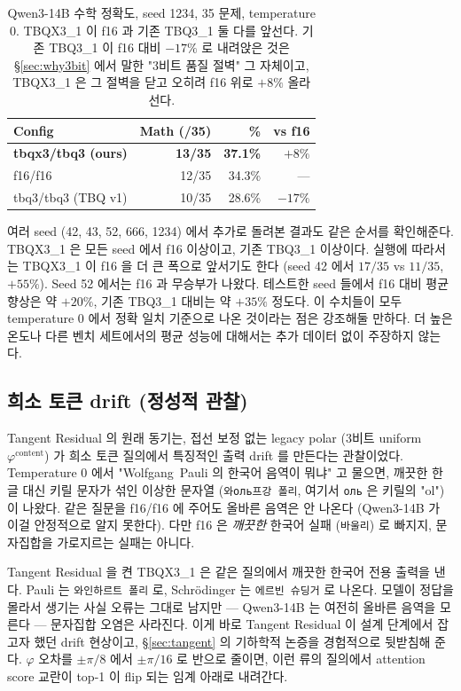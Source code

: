 \documentclass[10pt,twocolumn]{article}
\begin{document}
\begin{table}[t]
\centering
\small
\begin{tabular}{@{}lrrr@{}}
\toprule
\textbf{Config} & \textbf{Math (/35)} & \textbf{\%} & \textbf{vs f16} \\
\midrule
\textbf{tbqx3/tbq3 (ours)} & \textbf{13/35} & \textbf{37.1\%} & \textbf{$+8\%$} \\
f16/f16                    & 12/35 & 34.3\% & --- \\
tbq3/tbq3 (TBQ v1)         & 10/35 & 28.6\% & $-17\%$ \\
\bottomrule
\end{tabular}
\caption{Qwen3-14B 수학 정확도, seed 1234, 35 문제, temperature $0$. TBQX3\_1 이 f16 과 기존 TBQ3\_1 둘 다를 앞선다. 기존 TBQ3\_1 이 f16 대비 $-17\%$ 로 내려앉은 것은 \S\ref{sec:why3bit} 에서 말한 "3비트 품질 절벽" 그 자체이고, TBQX3\_1 은 그 절벽을 닫고 오히려 f16 위로 $+8\%$ 올라선다.}
\label{tab:math}
\end{table}

여러 seed (42, 43, 52, 666, 1234) 에서 추가로 돌려본 결과도 같은 순서를 확인해준다. TBQX3\_1 은 모든 seed 에서 f16 이상이고, 기존 TBQ3\_1 이상이다. 실행에 따라서는 TBQX3\_1 이 f16 을 더 큰 폭으로 앞서기도 한다 (seed 42 에서 $17/35$ vs $11/35$, $+55\%$). Seed 52 에서는 f16 과 무승부가 나왔다. 테스트한 seed 들에서 f16 대비 평균 향상은 약 $+20\%$, 기존 TBQ3\_1 대비는 약 $+35\%$ 정도다. 이 수치들이 모두 temperature $0$ 에서 정확 일치 기준으로 나온 것이라는 점은 강조해둘 만하다. 더 높은 온도나 다른 벤치 세트에서의 평균 성능에 대해서는 추가 데이터 없이 주장하지 않는다.

\subsection{희소 토큰 drift (정성적 관찰)}

Tangent Residual 의 원래 동기는, 접선 보정 없는 legacy polar (3비트 uniform $\varphi^{\text{content}}$) 가 희소 토큰 질의에서 특징적인 출력 drift 를 만든다는 관찰이었다. Temperature $0$ 에서 "Wolfgang~Pauli 의 한국어 음역이 뭐냐" 고 물으면, 깨끗한 한글 대신 키릴 문자가 섞인 이상한 문자열 (\texttt{와оль프강 폴리}, 여기서 \texttt{оль} 은 키릴의 "ol") 이 나왔다. 같은 질문을 f16/f16 에 주어도 올바른 음역은 안 나온다 (Qwen3-14B 가 이걸 안정적으로 알지 못한다). 다만 f16 은 \emph{깨끗한} 한국어 실패 (\texttt{바울리}) 로 빠지지, 문자집합을 가로지르는 실패는 아니다.

Tangent Residual 을 켠 TBQX3\_1 은 같은 질의에서 깨끗한 한국어 전용 출력을 낸다. Pauli 는 \texttt{와인하르트 폴리} 로, Schrödinger 는 \texttt{에르빈 슈딩거} 로 나온다. 모델이 정답을 몰라서 생기는 사실 오류는 그대로 남지만 --- Qwen3-14B 는 여전히 올바른 음역을 모른다 --- 문자집합 오염은 사라진다. 이게 바로 Tangent Residual 이 설계 단계에서 잡고자 했던 drift 현상이고, \S\ref{sec:tangent} 의 기하학적 논증을 경험적으로 뒷받침해 준다. $\varphi$ 오차를 $\pm\pi/8$ 에서 $\pm\pi/16$ 로 반으로 줄이면, 이런 류의 질의에서 attention score 교란이 top-1 이 flip 되는 임계 아래로 내려간다.
\end{document}
